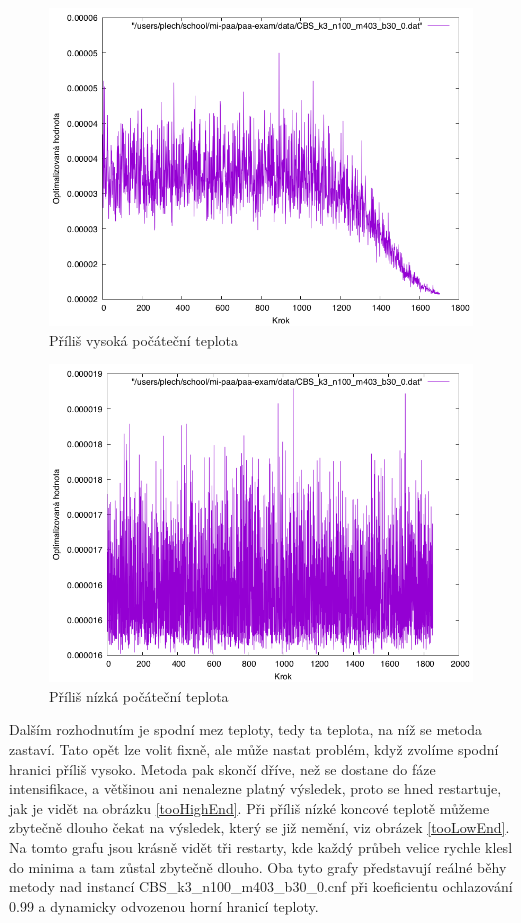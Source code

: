 \documentclass[12pt,a4paper]{article}
\begin{document}
\begin{figure}[H]
\includegraphics[width=\textwidth]{tooHighStart}
\caption{Příliš vysoká počáteční teplota}
\label{tooHighStart}
\end{figure}

\begin{figure}[H]
\includegraphics[width=\textwidth]{tooLowStart}
\caption{Příliš nízká počáteční teplota}
\label{tooLowStart}
\end{figure}

Dalším rozhodnutím je spodní mez teploty, tedy ta teplota, na níž se metoda zastaví. Tato opět lze volit fixně, ale může nastat problém, když zvolíme spodní hranici příliš vysoko. Metoda pak skončí dříve, než se dostane do fáze intensifikace, a většinou ani nenalezne platný výsledek, proto se hned restartuje, jak je vidět na obrázku \ref{tooHighEnd}. Při příliš nízké koncové teplotě můžeme zbytečně dlouho čekat na výsledek, který se již nemění, viz obrázek \ref{tooLowEnd}. Na tomto grafu jsou krásně vidět tři restarty, kde každý průbeh velice rychle klesl do minima a tam zůstal zbytečně dlouho. Oba tyto grafy představují reálné běhy metody nad instancí CBS\_k3\_n100\_m403\_b30\_0.cnf při koeficientu ochlazování 0.99 a dynamicky odvozenou horní hranicí teploty.
\end{document}
